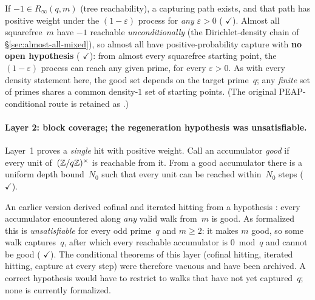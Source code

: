 If $-1 \in R_\infty(q,m)$ (tree reachability), a capturing path
exists, and that path has positive weight under the
$(1{-}\varepsilon)$ process for \emph{any} $\varepsilon > 0$
(
{\color{leanink}$\checkmark$}).
Almost all squarefree~$m$ have $-1$ reachable \emph{unconditionally}
(the Dirichlet-density chain of \S\ref{sec:almost-all-mixed}), so
almost all have positive-probability capture with \textbf{no open
hypothesis}
(
{\color{leanink}$\checkmark$}): from almost every squarefree starting
point, the $(1{-}\varepsilon)$ process can reach any given prime, for
every $\varepsilon > 0$.  As with every density statement here, the
good set depends on the target prime~$q$; any \emph{finite} set of
primes shares a common density-$1$ set of starting points.  (The
original PEAP-conditional route is retained as
.)

\paragraph{Layer 2: block coverage; the regeneration hypothesis was unsatisfiable.}
Layer~1 proves a \emph{single} hit with positive weight.  Call an
accumulator \emph{good} if every unit of~$(\mathbb{Z}/q\mathbb{Z})^\times$ is
reachable from it.  From a good accumulator there is a uniform depth
bound~$N_0$ such that every unit can be reached within~$N_0$ steps
(
{\color{leanink}$\checkmark$}).

An earlier version derived cofinal and iterated hitting from a
hypothesis : every accumulator encountered along
\emph{any} valid walk from~$m$ is good.  As formalized this is
\emph{unsatisfiable} for every odd prime~$q$ and $m \geq 2$: it makes
$m$ good, so some walk captures~$q$, after which every reachable
accumulator is $0 \bmod q$ and cannot be good
(
{\color{leanink}$\checkmark$}).  The conditional theorems of this layer
(cofinal hitting, iterated hitting, capture at every step) were
therefore vacuous and have been archived.  A correct hypothesis would
have to restrict to walks that have not yet captured~$q$; none is
currently formalized.

